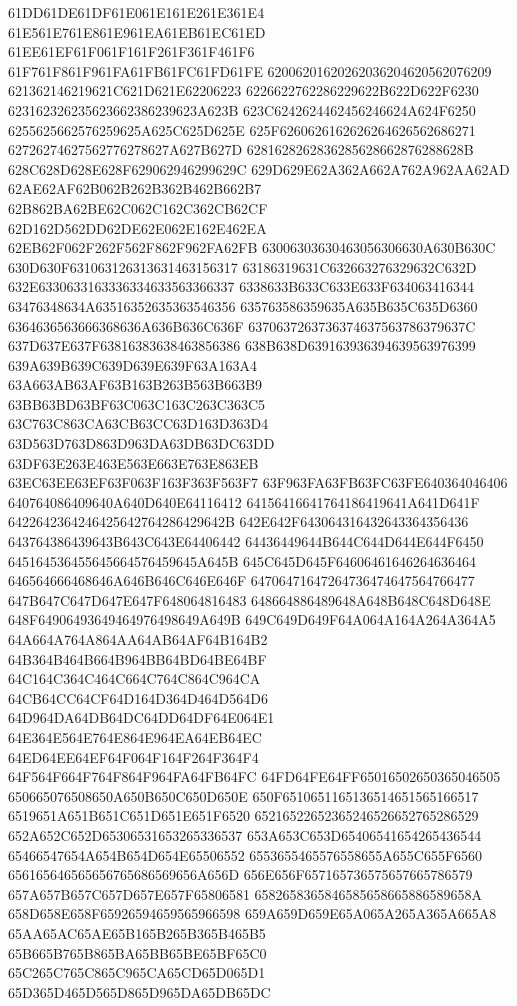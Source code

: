 61DD61DE61DF61E061E161E261E361E4
61E561E761E861E961EA61EB61EC61ED
61EE61EF61F061F161F261F361F461F6
61F761F861F961FA61FB61FC61FD61FE
62006201620262036204620562076209
621362146219621C621D621E62206223
6226622762286229622B622D622F6230
623162326235623662386239623A623B
623C6242624462456246624A624F6250
6255625662576259625A625C625D625E
625F6260626162626264626562686271
62726274627562776278627A627B627D
6281628262836285628662876288628B
628C628D628E628F629062946299629C
629D629E62A362A662A762A962AA62AD
62AE62AF62B062B262B362B462B662B7
62B862BA62BE62C062C162C362CB62CF
62D162D562DD62DE62E062E162E462EA
62EB62F062F262F562F862F962FA62FB
63006303630463056306630A630B630C
630D630F631063126313631463156317
63186319631C632663276329632C632D
632E6330633163336334633563366337
6338633B633C633E633F634063416344
63476348634A63516352635363546356
635763586359635A635B635C635D6360
6364636563666368636A636B636C636F
6370637263736374637563786379637C
637D637E637F63816383638463856386
638B638D639163936394639563976399
639A639B639C639D639E639F63A163A4
63A663AB63AF63B163B263B563B663B9
63BB63BD63BF63C063C163C263C363C5
63C763C863CA63CB63CC63D163D363D4
63D563D763D863D963DA63DB63DC63DD
63DF63E263E463E563E663E763E863EB
63EC63EE63EF63F063F163F363F563F7
63F963FA63FB63FC63FE640364046406
640764086409640A640D640E64116412
64156416641764186419641A641D641F
6422642364246425642764286429642B
642E642F643064316432643364356436
643764386439643B643C643E64406442
64436449644B644C644D644E644F6450
645164536455645664576459645A645B
645C645D645F64606461646264636464
646564666468646A646B646C646E646F
64706471647264736474647564766477
647B647C647D647E647F648064816483
648664886489648A648B648C648D648E
648F64906493649464976498649A649B
649C649D649F64A064A164A264A364A5
64A664A764A864AA64AB64AF64B164B2
64B364B464B664B964BB64BD64BE64BF
64C164C364C464C664C764C864C964CA
64CB64CC64CF64D164D364D464D564D6
64D964DA64DB64DC64DD64DF64E064E1
64E364E564E764E864E964EA64EB64EC
64ED64EE64EF64F064F164F264F364F4
64F564F664F764F864F964FA64FB64FC
64FD64FE64FF65016502650365046505
650665076508650A650B650C650D650E
650F6510651165136514651565166517
6519651A651B651C651D651E651F6520
65216522652365246526652765286529
652A652C652D65306531653265336537
653A653C653D65406541654265436544
65466547654A654B654D654E65506552
6553655465576558655A655C655F6560
656165646565656765686569656A656D
656E656F657165736575657665786579
657A657B657C657D657E657F65806581
6582658365846585658665886589658A
658D658E658F65926594659565966598
659A659D659E65A065A265A365A665A8
65AA65AC65AE65B165B265B365B465B5
65B665B765B865BA65BB65BE65BF65C0
65C265C765C865C965CA65CD65D065D1
65D365D465D565D865D965DA65DB65DC
